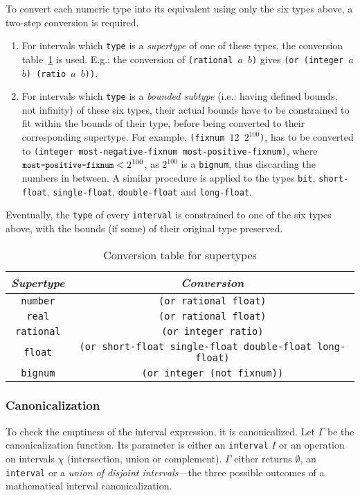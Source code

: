 \documentclass[format=sigconf]{acmart}
\newcommand\code[2][\small]{\sloppy\texttt{#1#2}}
\newcommand\mcode[2][\small]{\text{\code[#1]{#2}}}
\theoremstyle{definition}
\begin{document}
To convert each numeric type into its equivalent using only the six types above,
a two-step conversion is required.
\begin{enumerate}
\item For intervals which \code{type} is a \emph{supertype} of one of these
  types, the conversion table~\ref{tab:numequiv} is used. E.g.: the conversion
  of \code{(rational $a$ $b$)} gives \code{(or (integer $a$ $b$) (ratio $a$
    $b$))}.
\item For intervals which \code{type} is a \emph{bounded subtype} (i.e.: having
  defined bounds, not infinity) of these six types, their actual bounds have to
  be constrained to fit within the bounds of their type, before being converted
  to their corresponding supertype. For example, \code{(fixnum $12$ $2^{100}$)},
  has to be converted to \code{(integer most-negative-fixnum
    most-positive-fixnum)}, where $\mcode{most-positive-fixnum} < 2^{100}$, as
  $2^{100}$ is a \code{bignum}, thus discarding the numbers in between.
  A similar procedure is applied to the types \code{bit}, \code{short-float},
  \code{single-float}, \code{double-float} and \code{long-float}.
\end{enumerate}

Eventually, the \code{type} of every \code{interval} is constrained to one of
the six types above, with the bounds (if some) of their original type preserved.

\begin{table}
  \centering
  \begin{tabular}{|c|c|}
    \hline
    \emph{Supertype} & \emph{Conversion} \\
    \hline
    \code{number} & \code{(or rational float)} \\
    \code{real} & \code{(or rational float)} \\
    \code{rational} & \code{(or integer ratio)} \\
    \code{float} & \code[\scriptsize]{(or short-float single-float double-float long-float)} \\
    \code{bignum} & \code{(or integer (not fixnum))} \\
    \hline
  \end{tabular}
  \caption{Conversion table for supertypes}
  \label{tab:numequiv}
\end{table}

\subsubsection{Canonicalization}
To check the emptiness of the interval expression, it is canonicalized. Let
$\Gamma$ be the canonicalization function. Its parameter is either an
\code{interval} $I$ or an operation on intervals $\chi$ (intersection, union or
complement). $\Gamma$ either returns $\emptyset$, an \code{interval} or a
\emph{union of disjoint intervals}---the three possible outcomes of a
mathematical interval canonicalization.
\end{document}
